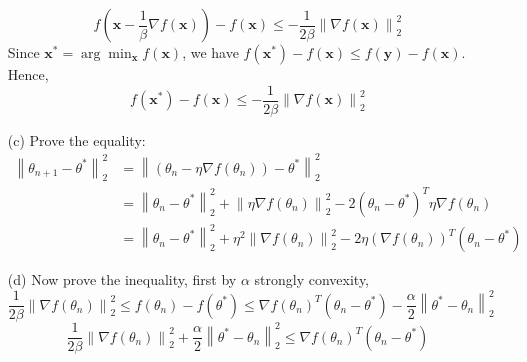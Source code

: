 \documentclass[12pt,a4paper]{article}
\begin{document}
\begin{enumerate}
\begin{equation*}
        \end{equation*}
        \begin{equation*}
            f(\mathbf{x} - \frac{1}{\beta} \nabla f(\mathbf{x})) - f(\mathbf{x})  \le   -\frac{1}{2\beta} \left\lVert \nabla f(\mathbf{x})\right\rVert _2^2 
        \end{equation*}
        Since $\mathbf{x}^{*} = \arg\min_{\mathbf{x}}f(\mathbf{x})$, we have $f(\mathbf{x}^{*}) - f(\mathbf{x}) \leq f(\mathbf{y}) - f(\mathbf{x})$. Hence,
        \begin{equation*}
            f(\mathbf{x}^{*}) - f(\mathbf{x}) \leq -\frac{1}{2\beta} \left\lVert \nabla f(\mathbf{x})\right\rVert _2^2 
        \end{equation*}
    \item[(c)]
        Prove the equality:
        \begin{equation*}
            \begin{split}
                \left\lVert \theta_{n+1} - \theta^*\right\rVert _2^2 
                    &= \left\lVert (\theta_n - \eta \nabla f(\theta_n)) - \theta^*\right\rVert _2^2\\
                    &= \left\lVert \theta_n - \theta^*\right\rVert _{2}^{2} + \left\lVert \eta \nabla f(\theta_n)\right\rVert _{2}^{2} - 2  (\theta_n - \theta^*)^T\eta \nabla f(\theta_n)\\
                    &= \left\lVert \theta_n - \theta^*\right\rVert _{2}^{2} + \eta^{2}\left\lVert \nabla f(\theta_n)\right\rVert _{2}^{2} - 2\eta(\nabla f(\theta_n))^T(\theta_n - \theta^*)
            \end{split}
        \end{equation*}
    \item[(d)]
        Now prove the inequality, first by $\alpha$ strongly convexity,
        \begin{equation*}
            \frac{1}{2\beta} \left\lVert \nabla f(\theta_{n})\right\rVert  _2^2 \leq f(\theta_{n}) - f(\theta^{*}) \leq \nabla f(\theta_{n})^T(\theta_{n} - \theta^{*}) - \frac{\alpha}{2}\left\lVert \theta^{*} - \theta_{n}\right\rVert _{2}^{2}
        \end{equation*}
        \begin{equation*}
            \frac{1}{2\beta} \left\lVert \nabla f(\theta_{n})\right\rVert  _2^2 + \frac{\alpha}{2}\left\lVert \theta^{*} - \theta_{n}\right\rVert _{2}^{2} \leq \nabla f(\theta_{n})^T(\theta_{n} - \theta^{*})
        \end{equation*}
        \begin{equation*}

\end{equation*}
\end{enumerate}
\end{document}
